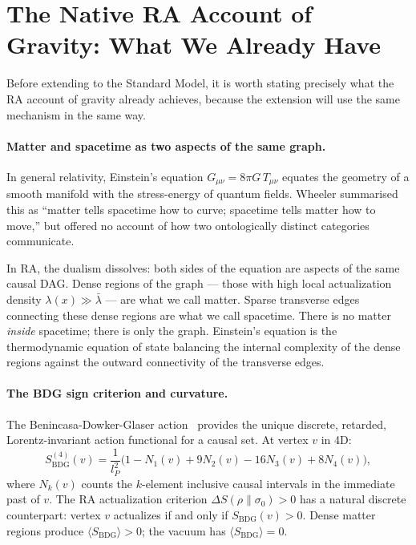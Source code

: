 \documentclass[11pt,a4paper]{article}
\newcommand{\SBDG}{S_{\mathrm{BDG}}}
\begin{document}
\section{The Native RA Account of Gravity: What We Already Have}
\label{sec:gravity_review}

Before extending to the Standard Model, it is worth stating precisely what the
RA account of gravity already achieves, because the extension will use the same
mechanism in the same way.

\paragraph{Matter and spacetime as two aspects of the same graph.}
In general relativity, Einstein's equation $G_{\mu\nu} = 8\pi G\,T_{\mu\nu}$
equates the geometry of a smooth manifold with the stress-energy of quantum
fields. Wheeler summarised this as ``matter tells spacetime how to curve;
spacetime tells matter how to move,'' but offered no account of how two
ontologically distinct categories communicate.

In RA, the dualism dissolves: both sides of the equation are aspects of the
same causal DAG. Dense regions of the graph --- those with high local
actualization density $\lambda(x) \gg \bar\lambda$ --- are what we call matter.
Sparse transverse edges connecting these dense regions are what we call
spacetime. There is no matter \emph{inside} spacetime; there is only the graph.
Einstein's equation is the thermodynamic equation of state balancing the
internal complexity of the dense regions against the outward connectivity of
the transverse edges.

\paragraph{The BDG sign criterion and curvature.}
The Benincasa-Dowker-Glaser action~\citep{Benincasa2010} provides the unique
discrete, retarded, Lorentz-invariant action functional for a causal set.
At vertex $v$ in 4D:
\begin{equation}
  \SBDG^{(4)}(v)
  = \frac{1}{l_P^2}\bigl(1 - N_1(v) + 9N_2(v) - 16N_3(v) + 8N_4(v)\bigr),
  \label{eq:BDG_4d}
\end{equation}
where $N_k(v)$ counts the $k$-element inclusive causal intervals in the
immediate past of $v$. The RA actualization criterion $\Delta S(\rho\|\sigma_0) > 0$
has a natural discrete counterpart: vertex $v$ actualizes if and only if
$\SBDG(v) > 0$. Dense matter regions produce $\langle \SBDG \rangle > 0$;
the vacuum has $\langle \SBDG \rangle = 0$.
\end{document}
